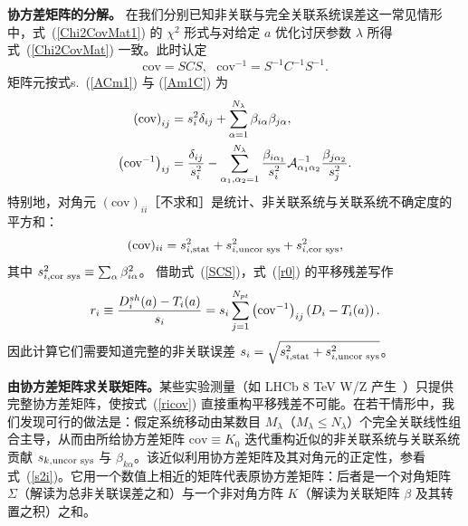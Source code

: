 {\bf 协方差矩阵的分解。}
在我们分别已知非关联与完全关联系统误差这一常见情形中，式~(\ref{Chi2CovMat1}) 的 $\chi^2$ 形式与对给定 $a$ 优化讨厌参数 $\lambda$ 所得式~(\ref{Chi2CovMat}) 一致。此时认定
\begin{equation}
\mbox{cov}=SCS,~~~\mbox{cov}^{-1}=S^{-1}C^{-1}S^{-1}.\label{SCS}
\end{equation}
 矩阵元按式s.~(\ref{ACm1}) 与 (\ref{Am1C}) 为
\begin{align}
\left(\mbox{cov}\right)_{ij} & =s_{i}^{2}\delta_{ij}+\sum_{\alpha=1}^{N_{\lambda}}\beta_{i\alpha}\beta_{j\alpha},\label{cov}\\
\left(\mbox{\mbox{cov}}^{-1}\right)_{ij} & =\frac{\delta_{ij}}{s_{i}^{2}}-\sum_{\alpha_1,\alpha_2=1}^{N_{\lambda}}\frac{\beta_{i\alpha_1}}{s_{i}^{2}}{\cal {\cal A}}_{\alpha_1\alpha_2}^{-1}\frac{\beta_{j\alpha_2}}{s_{j}^{2}}.\label{covm1}
\end{align}
特别地，对角元 $(\mbox{cov})_{ii}$［不求和］是统计、非关联系统与关联系统不确定度的平方和：
\begin{equation}
(\mbox{cov})_{ii}=s_{i,\mbox{\scriptsize stat}}^{2}+s_{i,\mbox{\scriptsize uncor sys}}^{2}+s_{i,\mbox{\scriptsize cor sys}}^{2},\label{s2i}
\end{equation}
其中 $s_{i,\mbox{\scriptsize cor sys}}^{2}\equiv\sum_{\alpha}\beta_{i\alpha}^{2}$。
借助式~(\ref{SCS})，式~(\ref{r0}) 的平移残差写作
\begin{equation}
r_{i}\equiv\frac{D_{i}^{sh}(a)-T_{i}(a)}{s_{i}}=s_{i}\sum_{j=1}^{N_{pt}}\left(\mbox{\mbox{cov}}^{-1}\right)_{ij}\left(D_{i}-T_{i}(a)\right).\label{ricov}
\end{equation}
因此计算它们需要知道完整的非关联误差 $s_{i}=\sqrt{s_{i,\mbox{\scriptsize stat}}^{2}+s_{i,\mbox{\scriptsize uncor sys}}^{2}}$。

{\bf 由协方差矩阵求关联矩阵。}某些实验测量（如 LHCb 8 TeV W/Z 产生~\cite{Aaij:2015zlq}）只提供完整协方差矩阵，使按式~(\ref{ricov}) 直接重构平移残差不可能。在若干情形中，我们发现可行的做法是：假定系统移动由某数目 $M_{\lambda}$（$M_{\lambda}\leq N_{\lambda}$）个完全关联线性组合主导，从而由所给协方差矩阵 $\mbox{cov}\equiv K_{0}$ 迭代重构近似的非关联系统与关联系统贡献 $s_{k,\mbox{\scriptsize uncor sys}}$ 与 $\beta_{k\alpha}$。该近似利用协方差矩阵及其对角元的正定性，参看式~(\ref{s2i})。它用一个数值上相近的矩阵代表原协方差矩阵：后者是一个对角矩阵 $\Sigma$（解读为总非关联误差之和）与一个非对角方阵 $K$（解读为关联矩阵 $\beta$ 及其转置之积）之和。


